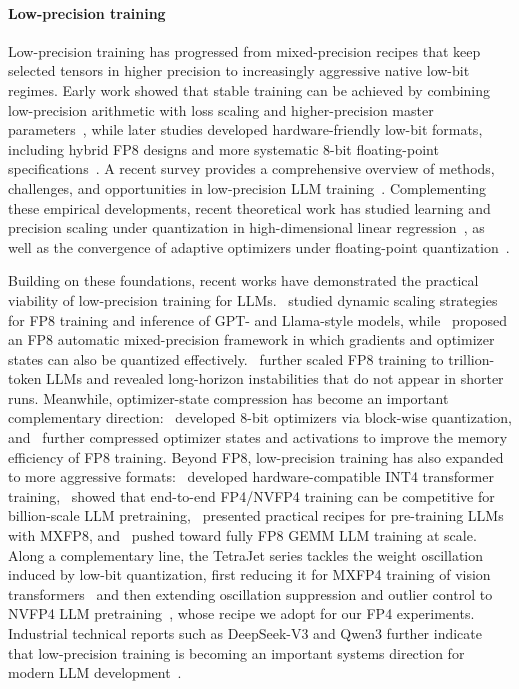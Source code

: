 \documentclass{article}
\begin{document}
\paragraph{Low-precision training}
Low-precision training has progressed from mixed-precision recipes that keep selected tensors in higher precision to increasingly aggressive native low-bit regimes. Early work showed that stable training can be achieved by combining low-precision arithmetic with loss scaling and higher-precision master parameters~\citep{micikevicius2018mixed}, while later studies developed hardware-friendly low-bit formats, including hybrid FP8 designs and more systematic 8-bit floating-point specifications~\citep{NEURIPS2019hybrid_fp8,noune20228bit,micikevicius2022fp8}. A recent survey provides a comprehensive overview of methods, challenges, and opportunities in low-precision LLM training~\citep{hao2025lowprecisionsurvey}. Complementing these empirical developments, recent theoretical work has studied learning and precision scaling under quantization in high-dimensional linear regression~\citep{zhang2026learning,zhang2026scaling}, as well as the convergence of adaptive optimizers under floating-point quantization~\citep{tang2026floating}.

Building on these foundations, recent works have demonstrated the practical viability of low-precision training for LLMs.~\citet{perez2023training} studied dynamic scaling strategies for FP8 training and inference of GPT- and Llama-style models, while~\citet{peng2023fp8} proposed an FP8 automatic mixed-precision framework in which gradients and optimizer states can also be quantized effectively.~\citet{ICLR2025fp8scaling} further scaled FP8 training to trillion-token LLMs and revealed long-horizon instabilities that do not appear in shorter runs. Meanwhile, optimizer-state compression has become an important complementary direction:~\citet{dettmers2022_8bit} developed 8-bit optimizers via block-wise quantization, and~\citet{ICLR2025coat} further compressed optimizer states and activations to improve the memory efficiency of FP8 training. Beyond FP8, low-precision training has also expanded to more aggressive formats:~\citet{xi2023int4} developed hardware-compatible INT4 transformer training,~\citet{castro2025quartet_fp4,abecassis2025pretraining_fp4} showed that end-to-end FP4/NVFP4 training can be competitive for billion-scale LLM pretraining,~\citet{mishra2025mxfp8} presented practical recipes for pre-training LLMs with MXFP8, and~\citet{hernandez-cano2025fp8gemm} pushed toward fully FP8 GEMM LLM training at scale. Along a complementary line, the TetraJet series tackles the weight oscillation induced by low-bit quantization, first reducing it for MXFP4 training of vision transformers~\citep{chen2025tetrajetv1} and then extending oscillation suppression and outlier control to NVFP4 LLM pretraining~\citep{chen2026tetrajetv2}, whose recipe we adopt for our FP4 experiments. Industrial technical reports such as DeepSeek-V3 and Qwen3 further indicate that low-precision training is becoming an important systems direction for modern LLM development~\citep{liu2024deepseek,yang2025qwen3}.
\end{document}
